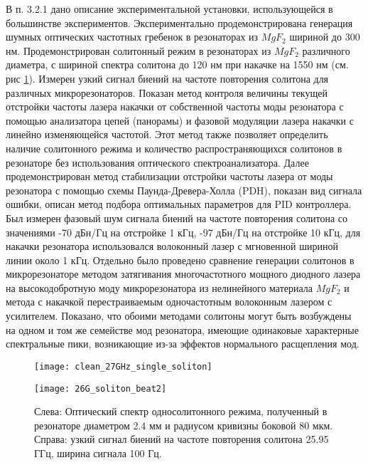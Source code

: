 В п. 3.2.1 дано описание экспериментальной установки, использующейся в большинстве экспериментов. Экспериментально продемонстрирована генерация шумных оптических частотных гребенок в резонаторах из $MgF_2$ шириной до 300 нм. Продемонстрирован солитонный режим в резонаторах из $MgF_2$ различного диаметра, с шириной спектра солитона до 120 нм при накачке на 1550 нм (см. рис \ref{clean_27GHz_single_soliton}). Измерен узкий сигнал биений на частоте повторения солитона для различных микрорезонаторов. Показан метод контроля величины текущей отстройки частоты лазера накачки от собственной частоты моды резонатора с помощью анализатора цепей (панорамы) и фазовой модуляции лазера накачки с линейно изменяющейся частотой. Этот метод также позволяет определить наличие солитонного режима и количество распространяющихся солитонов в резонаторе без использования оптического спектроанализатора. Далее продемонстрирован метод стабилизации отстройки частоты лазера от моды резонатора с помощью схемы Паунда-Древера-Холла (PDH), показан вид сигнала ошибки, описан метод подбора оптимальных параметров для PID контроллера. Был измерен фазовый шум сигнала биений на частоте
повторения солитона со значениями -70 дБн/Гц на отстройке 1 кГц, -97 дБн/Гц на отстройке 10 кГц, для накачки резонатора использовался волоконный лазер с мгновенной шириной линии около 1 кГц. Отдельно было проведено сравнение генерации солитонов в микрорезонаторе методом затягивания многочастотного мощного диодного лазера на высокодобротную моду микрорезонатора из нелинейного материала $MgF_2$ и метода с накачкой перестраиваемым одночастотным волоконным лазером с усилителем. Показано, что обоими методами солитоны могут быть возбуждены на одном и том же семействе мод резонатора, имеющие одинаковые характерные спектральные пики, возникающие из-за эффектов нормального расщепления мод.

\begin{figure}[ht]
  \begin{minipage}[ht]{0.49\linewidth}\centering
    \texttt{[image: clean\_27GHz\_single\_soliton]}
  \end{minipage}
  \hfill
  \begin{minipage}[ht]{0.49\linewidth}\centering
    \texttt{[image: 26G\_soliton\_beat2]}
  \end{minipage}
  \caption{Слева: Оптический спектр односолитонного режима, полученный в резонаторе диаметром 2.4 мм и радиусом кривизны боковой 80 мкм. Справа: узкий сигнал биений на частоте повторения солитона 25.95 ГГц, ширина сигнала 100 Гц.}
  \label{clean_27GHz_single_soliton}
\end{figure}

